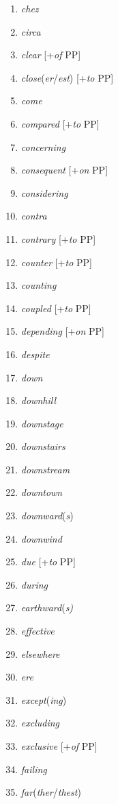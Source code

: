 \begin{multicols}{3}
\begin{enumerate}[noitemsep]
    \item \textit{chez}
    \item \textit{circa}
    \item \textit{clear} [+\textit{of} PP]
    \item \textit{close}(\textit{er}/\textit{est}) [+\textit{to} PP]
    \item \textit{come}
    \item \textit{compared} [+\textit{to} PP]
    \item \textit{concerning}
    \item \textit{consequent} [+\textit{on} PP]
    \item \textit{considering}
    \item \textit{contra}
    \item \textit{contrary} [+\textit{to} PP]
    \item \textit{counter} [+\textit{to} PP]
    \item \textit{counting}
    \item \textit{coupled} [+\textit{to} PP]
    \item \textit{depending}  [+\textit{on} PP]
    \item \textit{despite}
    \item \textit{down}
    \item \textit{downhill}
    \item \textit{downstage}
    \item \textit{downstairs}
    \item \textit{downstream}
    \item \textit{downtown}
    \item \textit{downward}(\textit{s})
    \item \textit{downwind}
    \item \textit{due} [+\textit{to} PP]
    \item \textit{during}
    \item \textit{earthward}(\textit{s)}
    \item \textit{effective}
    \item \textit{elsewhere}
    \item \textit{ere}
    \item \textit{except}(\textit{ing})
    \item \textit{excluding}
    \item \textit{exclusive} [+\textit{of} PP]
    \item \textit{failing}
    \item \textit{far}(\textit{ther}/\textit{thest})

\end{enumerate}
\end{multicols}
